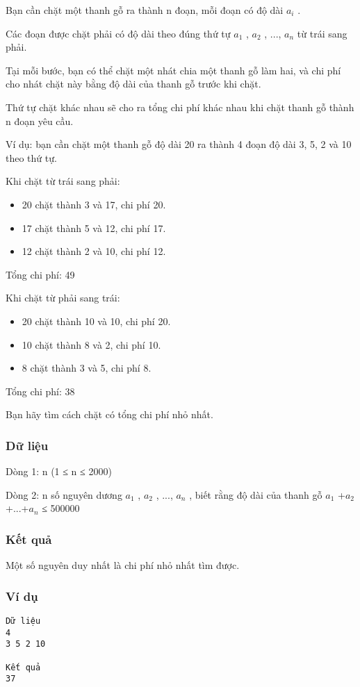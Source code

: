 

Bạn cần chặt một thanh gỗ ra thành n đoạn, mỗi đoạn có độ dài $a_{i}$ .

Các đoạn được chặt phải có độ dài theo đúng thứ tự $a_{1}$ , $a_{2}$ , ..., $a_{n}$ từ trái sang phải.

Tại mỗi bước, bạn có thể chặt một nhát chia một thanh gỗ làm hai, và chi phí cho nhát chặt này bằng độ dài của thanh gỗ trước khi chặt.

Thứ tự chặt khác nhau sẽ cho ra tổng chi phí khác nhau khi chặt thanh gỗ thành n đoạn yêu cầu.

Ví dụ: bạn cần chặt một thanh gỗ độ dài 20 ra thành 4 đoạn độ dài 3, 5, 2 và 10 theo thứ tự.

Khi chặt từ trái sang phải:
\begin{itemize}
	\item 20 chặt thành 3 và 17, chi phí 20.
	\item 17 chặt thành 5 và 12, chi phí 17.
	\item 12 chặt thành 2 và 10, chi phí 12.
\end{itemize}

Tổng chi phí: 49

Khi chặt từ phải sang trái:
\begin{itemize}
	\item 20 chặt thành 10 và 10, chi phí 20.
	\item 10 chặt thành 8 và 2, chi phí 10.
	\item 8 chặt thành 3 và 5, chi phí 8.
\end{itemize}

Tổng chi phí: 38

Bạn hãy tìm cách chặt có tổng chi phí nhỏ nhất.

\subsubsection{Dữ liệu}

Dòng 1: n (1 ≤ n ≤ 2000)

Dòng 2: n số nguyên dương $a_{1}$ , $a_{2}$ , ..., $a_{n}$ , biết rằng độ dài của thanh gỗ $a_{1}$ +$a_{2}$ +...+$a_{n}$ ≤ 500000

\subsubsection{Kết quả}

Một số nguyên duy nhất là chi phí nhỏ nhất tìm được.

\subsubsection{Ví dụ}
\begin{verbatim}
Dữ liệu
4
3 5 2 10

Kết quả
37
\end{verbatim}

